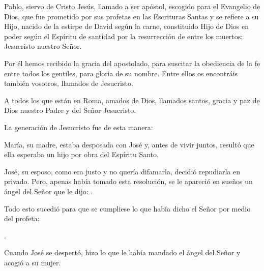 			 
			
			
			\begin{scripture}
				Pablo, siervo de Cristo Jesús, llamado a ser apóstol, escogido para el Evangelio de Dios, que fue prometido por sus profetas en las Escrituras Santas y se refiere a su Hijo, nacido de la estirpe de David según la carne, constituido Hijo de Dios en poder según el Espíritu de santidad por la resurrección de entre los muertos: Jesucristo nuestro Señor.
				
				Por él hemos recibido la gracia del apostolado, para suscitar la obediencia de la fe entre todos los gentiles, para gloria de su nombre. Entre ellos os encontráis también vosotros, llamados de Jesucristo.
				
				A todos los que están en Roma, amados de Dios, llamados santos, gracia y paz de Dios nuestro Padre y del Señor Jesucristo.
			\end{scripture}


			 


			\begin{scripture}
				La generación de Jesucristo fue de esta manera: 
				
				María, su madre, estaba desposada con José y, antes de vivir juntos, resultó que ella esperaba un hijo por obra del Espíritu Santo.
				
				José, su esposo, como era justo y no quería difamarla, decidió repudiarla en privado. Pero, apenas había tomado esta resolución, se le apareció en sueños un ángel del Señor que le dijo: .
				
				Todo esto sucedió para que se cumpliese lo que había dicho el Señor por medio del profeta:
				
				.
				
				Cuando José se despertó, hizo lo que le había mandado el ángel del Señor y acogió a su mujer.
			\end{scripture}

